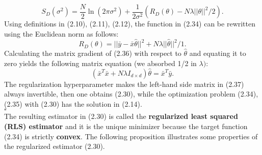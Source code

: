 \documentclass{report}
\begin{document}
\begin{equation}
S_{D}(\sigma^2) = \frac{N}{2}\ln(2\pi\sigma^2)+\frac{1}{2\sigma^2}(R_{D}(\theta)-N\lambda||\theta||^2/2).
\end{equation}
Using definitions in (2.10), (2.11), (2.12), the function in (2.34) can be rewritten using the Euclidean norm as follows:
\begin{equation}
R_{D}(\theta) = ||\bar{y} -\bar{x}\hat{\theta}||^2 + N\lambda||\hat{\theta}||^2 / 1.
\end{equation}
Calculating the matrix gradient of (2.36) with respect to $\hat{\theta}$ and equating it to zero yields the following matrix equation (we absorbed 1/2 in $\lambda)$:
\begin{equation}
(\bar{x}^T\bar{x}+ N\lambda I_{d\times d})\hat{\theta} = \bar{x}^T\bar{y}.
\end{equation}
The regularization hyperparameter makes the left-hand side matrix in (2.37) always invertible, then one obtains (2.30), while the optimization problem (2.34), (2.35) with (2.30) has the solution in (2.14).\\
$\square$\\
The resulting estimator in (2.30) is called the \textbf{regularized least squared (RLS) estimator} and it is the unique minimizer because the target function (2.34) is strictly \textbf{convex}. The following proposition illustrates some properties of the regularized estimator (2.30).
\end{document}
